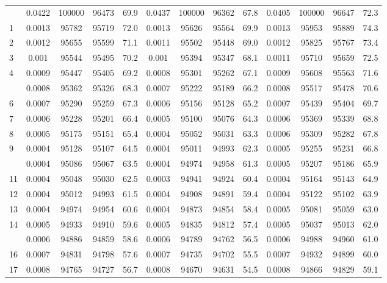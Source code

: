 \documentclass[
  14pt,
]{article}
\begin{document}
\begin{longtable}[t]{lcccccccccccc}
\endfoot
\bottomrule
\endlastfoot
0 & 0.0422 & 100000 & 96473 & 69.9 & 0.0437 & 100000 & 96362 & 67.8 & 0.0405 & 100000 & 96647 & 72.3\\
1 & 0.0013 & 95782 & 95719 & 72.0 & 0.0013 & 95626 & 95564 & 69.9 & 0.0013 & 95953 & 95889 & 74.3\\
2 & 0.0012 & 95655 & 95599 & 71.1 & 0.0011 & 95502 & 95448 & 69.0 & 0.0012 & 95825 & 95767 & 73.4\\
3 & 0.001 & 95544 & 95495 & 70.2 & 0.001 & 95394 & 95347 & 68.1 & 0.0011 & 95710 & 95659 & 72.5\\
4 & 0.0009 & 95447 & 95405 & 69.2 & 0.0008 & 95301 & 95262 & 67.1 & 0.0009 & 95608 & 95563 & 71.6\\
\addlinespace
5 & 0.0008 & 95362 & 95326 & 68.3 & 0.0007 & 95222 & 95189 & 66.2 & 0.0008 & 95517 & 95478 & 70.6\\
6 & 0.0007 & 95290 & 95259 & 67.3 & 0.0006 & 95156 & 95128 & 65.2 & 0.0007 & 95439 & 95404 & 69.7\\
7 & 0.0006 & 95228 & 95201 & 66.4 & 0.0005 & 95100 & 95076 & 64.3 & 0.0006 & 95369 & 95339 & 68.8\\
8 & 0.0005 & 95175 & 95151 & 65.4 & 0.0004 & 95052 & 95031 & 63.3 & 0.0006 & 95309 & 95282 & 67.8\\
9 & 0.0004 & 95128 & 95107 & 64.5 & 0.0004 & 95011 & 94993 & 62.3 & 0.0005 & 95255 & 95231 & 66.8\\
\addlinespace
10 & 0.0004 & 95086 & 95067 & 63.5 & 0.0004 & 94974 & 94958 & 61.3 & 0.0005 & 95207 & 95186 & 65.9\\
11 & 0.0004 & 95048 & 95030 & 62.5 & 0.0003 & 94941 & 94924 & 60.4 & 0.0004 & 95164 & 95143 & 64.9\\
12 & 0.0004 & 95012 & 94993 & 61.5 & 0.0004 & 94908 & 94891 & 59.4 & 0.0004 & 95122 & 95102 & 63.9\\
13 & 0.0004 & 94974 & 94954 & 60.6 & 0.0004 & 94873 & 94854 & 58.4 & 0.0005 & 95081 & 95059 & 63.0\\
14 & 0.0005 & 94933 & 94910 & 59.6 & 0.0005 & 94835 & 94812 & 57.4 & 0.0005 & 95037 & 95013 & 62.0\\
\addlinespace
15 & 0.0006 & 94886 & 94859 & 58.6 & 0.0006 & 94789 & 94762 & 56.5 & 0.0006 & 94988 & 94960 & 61.0\\
16 & 0.0007 & 94831 & 94798 & 57.6 & 0.0007 & 94735 & 94702 & 55.5 & 0.0007 & 94932 & 94899 & 60.0\\
17 & 0.0008 & 94765 & 94727 & 56.7 & 0.0008 & 94670 & 94631 & 54.5 & 0.0008 & 94866 & 94829 & 59.1\\

\end{longtable}
\end{document}
